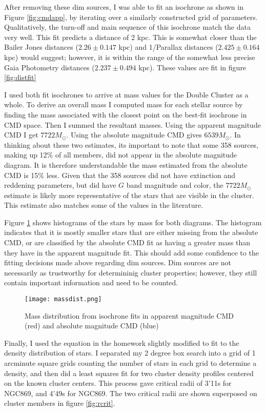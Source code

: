 \documentclass[twocolumn]{aastex631}
\begin{document}
After removing these dim sources, I was able to fit an isochrone as shown in Figure \ref{fig:cmdapp}, by iterating over a similarly constructed grid of parameters. Qualitatively, the turn-off and main sequence of this isochrone match the data very well. This fit predicts a distance of 2 kpc. This is somewhat closer than the Bailer Jones distances ($2.26 \pm  0.147$ kpc) and 1/Parallax distances ($2.425 \pm 0.164$ kpc) would suggest; however, it is within the range of the somewhat less precise Gaia Photometry distances ($2.237 \pm 0.494$ kpc). These values are fit in figure \ref{fig:distfit}

I used both fit isochrones to arrive at mass values for the Double Cluster as a whole. To derive an overall mass I computed mass for each stellar source by finding the mass associated with the closest point on the best-fit isochrone in CMD space. Then I summed the resultant masses. Using the apparent magnitude CMD I get $7722 M_\odot$. Using the absolute magnitude CMD gives $6539 M_\odot$.  In thinking about these two estimates, its important to note that some 358 sources, making up 12\% of all members, did not appear in the absolute magnitude diagram. It is therefore understandable the mass estimated from the absolute CMD is 15\% less. Given that the 358 sources did not have extinction and reddening parameters, but did have $G$ band magnitude and color, the $7722 M_\odot$ estimate is likely more representative of the stars that are visible in the cluster. This estimate also matches some of the values in the literature\cite{braggStructure2005}.

Figure \ref{fig:massdist} shows histograms of the stars by mass for both diagrams. The histogram indicates that it is mostly smaller stars that are either missing from the absolute CMD, or are classified by the absolute CMD fit as having a greater mass than they have in the apparent magnitude fit. This should add some confidence to the fitting decisions made above regarding dim sources. Dim sources are not necessarily as trustworthy for determininig cluster properties; however, they still contain important information and need to be counted.

\begin{figure}[h]
\centering
\texttt{[image: massdist.png]} 
\caption{Mass distribution from isochrone fits in apparent magnitude CMD (red) and absolute magnitude CMD (blue)}
\label{fig:massdist}
\end{figure}

Finally, I used the equation in the homework slightly modified to fit to the density distribution of stars. I separated my 2 degree box search into a grid of 1 arcminute square grids counting the number of stars in each grid to determine a density, and then did a least squares fit for two cluster density profiles centered on the known cluster centers. This process gave critical radii of 3'11s for NGC869, and 4'49s for NGC869. The two critical radii are shown superposed on cluster members in figure \ref{fig:rcrit}.
\end{document}
